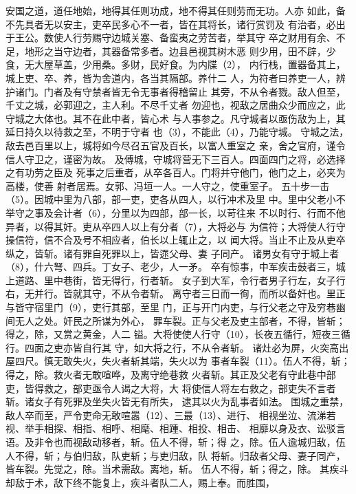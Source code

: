 \documentclass[12pt,UTF8]{ctexbook}
\begin{document}
安国之道，道任地始，地得其任则功成，地不得其任则劳而无功。人亦 
如此，备不先具者无以安主，吏卒民多心不一者，皆在其将长，诸行赏罚及 
有治者，必出于王公。数使人行劳赐守边城关塞、备蛮夷之劳苦者，举其守 
卒之财用有余、不足，地形之当守边者，其器备常多者。边县邑视其树木恶 
则少用，田不辟，少食，无大屋草盖，少用桑。多财，民好食。为内牒（2）， 
内行栈，置器备其上，城上吏、卒、养，皆为舍道内，各当其隔部。养什二 
人，为符者曰养吏一人，辨护诸门。门者及有守禁者皆无令无事者得稽留止 
其旁，不从令者戮。敌人但至，千丈之城，必郭迎之，主人利。不尽千丈者 
勿迎也，视敌之居曲众少而应之，此守城之大体也。其不在此中者，皆心术 
与人事参之。凡守城者以亟伤敌为上，其延日持久以待救之至，不明于守者 
也（3），不能此（4），乃能守城。 
守城之法，敌去邑百里以上，城将如今尽召五官及百长，以富人重室之 
亲，舍之官府，谨令信人守卫之，谨密为故。 
及傅城，守城将营无下三百人。四面四门之将，必选择之有功劳之臣及 
死事之后重者，从卒各百人。门将并守他门，他门之上，必夹为高楼，使善 
射者居焉。女郭、冯垣一人。一人守之，使重室子。 
五十步一击（5）。因城中里为八部，部一吏，吏各从四人，以行冲术及里 
中。里中父老小不举守之事及会计者（6），分里以为四部，部一长，以苛往来 
不以时行、行而不他异者，以得其奸。吏从卒四人以上有分者（7），大将必与 
为信符；大将使人行守操信符，信不合及号不相应者，伯长以上辄止之，以 
闻大将。当止不止及从吏卒纵之，皆斩。诸有罪自死罪以上，皆遝父母、妻 
子同产。 
诸男女有守于城上者（8），什六弩、四兵。丁女子、老少，人一矛。 
卒有惊事，中军疾击鼓者三，城上道路、里中巷街，皆无得行，行者斩。 
女子到大军，令行者男子行左，女子行右，无并行。皆就其守，不从令者斩。 
离守者三日而一徇，而所以备奸也。里正与皆守宿里门（9），吏行其部，至里 
门，正与开门内吏，与行父老之守及穷巷幽间无人之处。奸民之所谋为外心， 
罪车裂。正与父老及吏主部者，不得，皆斩；得之，除，又赏之黄金，人二 
镒。大将使使人行守（10），长夜五循行，短夜三循行。四面之吏亦皆自行其 
守，如大将之行，不从令者斩。 
诸灶必为屏，火突高出屋四尺。慎无敢失火，失火者斩其端，失火以为 
事者车裂（11）。伍人不得，斩；得之，除。救火者无敢喧哗，及离守绝巷救 
火者斩。其正及父老有守此巷中部吏，皆得救之，部吏亟令人谒之大将，大 
将使信人将左右救之，部吏失不言者斩。诸女子有死罪及坐失火皆无有所失， 
逮其以火为乱事者如法。 
围城之重禁，敌人卒而至，严令吏命无敢喧嚣（12）、三最（13）、进行、 
相视坐泣、流涕若视、举手相探、相指、相呼、相麾、相踵、相投、相击、 
相靡以身及衣、讼驳言语。及非令也而视敌动移者，斩。伍人不得，斩；得 
之，除。伍人逾城归敌，伍人不得，斩；与伯归敌，队吏斩；与吏归敌，队 
将斩。归敌者父母、妻子同产，皆车裂。先觉之，除。当术需敌。离地，斩。 
伍人不得，斩；得之，除。 
其疾斗却敌于术，敌下终不能复上，疾斗者队二人，赐上奉。而胜围， 
\end{document}
